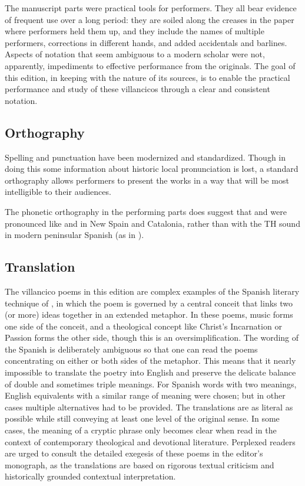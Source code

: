 The manuscript parts were practical tools for performers.
They all bear evidence of frequent use over a long period: they are soiled 
along the creases in the paper where performers held them up, and they include 
the names of multiple performers, corrections in different hands, and added 
accidentals and barlines.
Aspects of notation that seem ambiguous to a modern scholar were not, 
apparently, impediments to effective performance from the originals.
The goal of this edition, in keeping with the nature of its sources, is to 
enable the practical performance and study of these villancicos through a clear
and consistent notation.


\subsection{Orthography}

Spelling and punctuation have been modernized and standardized.
Though in doing this some information about historic local pronunciation is
lost, a standard orthography allows performers to present the works in a way
that will be most intelligible to their audiences.%
\begin{Footnote}
    The phonetic orthography in the performing parts does suggest that
     and  were pronounced like  and
     in New Spain and Catalonia, rather than with the TH sound in
    modern peninsular Spanish (as in ).
\end{Footnote}

\subsection{Translation}

The villancico poems in this edition are complex examples of the Spanish
literary technique of , in which the poem is governed by a
central conceit that links two (or more) ideas together in an extended
metaphor.%
    \Autocites
    [13--14]{Cashner:HearingFaith}
    {Gaylord:Poetry}
In these poems, music forms one side of the conceit, and a theological concept
like Christ's Incarnation or Passion forms the other side, though this is an
oversimplification.
The wording of the Spanish is deliberately ambiguous so that one can read the
poems concentrating on either or both sides of the metaphor.
This means that it nearly impossible to translate the poetry into English and
preserve the delicate balance of double and sometimes triple meanings.
For Spanish words with two meanings, English equivalents with a similar range of
meaning were chosen; but in other cases multiple alternatives had to be
provided.
The translations are as literal as possible while still conveying at least one
level of the original sense.
In some cases, the meaning of a cryptic phrase only becomes clear when read in
the context of contemporary theological and devotional literature.
Perplexed readers are urged to consult the detailed exegesis of these poems in
the editor's monograph, as the translations are based on rigorous textual
criticism and historically grounded contextual interpretation.%
    \Autocite{Cashner:HearingFaith}

